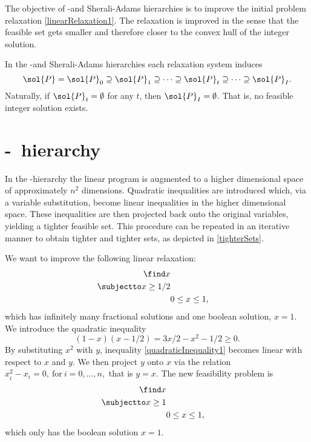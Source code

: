 \documentclass[a4paper,twoside,justified]{tufte-handout}
\begin{document}
The objective of \Lovasz-\Schrijver and Sherali-Adams hierarchies is to improve the initial problem relaxation \eqref{linearRelaxation1}. The relaxation is improved in the sense that the feasible set gets smaller and therefore closer to the convex hull of the integer solution. 

In the \Lovasz-\Schrijver and Sherali-Adams hierarchies each relaxation system induces
\begin{equation}
\label{tighterSets}
\sol{P}=\sol{P}_{0} \supseteq \sol{P}_{1} \supseteq \cdots
  \supseteq \sol{P}_{t} \supseteq \cdots\supseteq \sol{P}_{I}.
\end{equation}
Naturally, if $\sol{P}_{t}=\emptyset$ for any $t$, then $\sol{P}_{I}=\emptyset$. That is, no feasible integer solution exists.

\section{\Lovasz-\Schrijver\ hierarchy}
In the \Lovasz-\Schrijver hierarchy\cite{lovasz1991cones} the linear program is augmented to a higher dimensional space of approximately $n^2$ dimensions. Quadratic inequalities are introduced which, via a variable substitution, become linear inequalities in the higher dimensional space. These inequalities are then projected back onto the original variables, yielding a tighter feasible set. This procedure can be repeated in an iterative manner to obtain tighter and tighter sets, as depicted in \eqref{tighterSets}.

\begin{example}
We want to improve the following linear relaxation:
\begin{alignat}{2}
\label{example1}
  \find x\notag \\
  \subjectto x \geq 1/2 \\
  & 0\leq x\leq 1,\notag
\end{alignat}
which has infinitely many fractional solutions and one boolean solution, $x=1$. We introduce the quadratic inequality 
\begin{equation}
\label{quadraticInequality1}
(1-x)(x-1/2)=3x/2-x^2-1/2\geq 0. 
\end{equation}
By substituting $x^2$ with $y$, inequality \eqref{quadraticInequality1} becomes linear with respect to $x$ and $y$. We then project $y$ onto $x$ via the relation $x_i^2-x_i=0,\ \text{for}\ i=0,\ldots,n,$ that is $y=x$. The new feasibility problem is
\begin{alignat}{2}
\label{example2}
  \find x\notag \\
  \subjectto x \geq 1 \\
  & 0\leq x\leq 1,\notag
\end{alignat}
which only has the boolean solution $x=1$.
\end{example}
\end{document}
